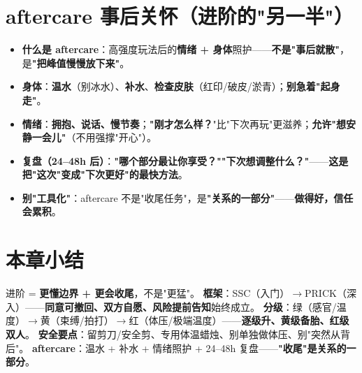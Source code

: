 \documentclass[12pt,UTF8,openany]{ctexbook}
\begin{document}
\section{aftercare 事后关怀（进阶的"另一半"）}
\begin{itemize}[leftmargin=2em,itemsep=0.3em]
  \item \textbf{什么是 aftercare}：高强度玩法后的\textbf{情绪 + 身体}照护——\textbf{不是"事后就散"}，是\textbf{"把峰值慢慢放下来"}。
  \item \textbf{身体}：\textbf{温水}（别冰水）、\textbf{补水}、\textbf{检查皮肤}（红印/破皮/淤青）；\textbf{别急着"起身走"}。
  \item \textbf{情绪}：\textbf{拥抱、说话、慢节奏}；\textbf{"刚才怎么样？}"比"下次再玩"更滋养；\textbf{允许"想安静一会儿"}（不用强撑"开心"）。
  \item \textbf{复盘（24--48h 后）}：\textbf{"哪个部分最让你享受？""下次想调整什么？"}——\textbf{这是把"这次"变成"下次更好"的最快方法}。
  \item \textbf{别"工具化"}：aftercare 不是"收尾任务"，是\textbf{"关系的一部分"}——\textbf{做得好，信任会累积}。
\end{itemize}

\section{本章小结}
进阶 = \textbf{更懂边界 + 更会收尾}，不是"更猛"。
\textbf{框架}：SSC（入门）$\to$PRICK（深入）——\textbf{同意可撤回、双方自愿、风险提前告知}始终成立。
\textbf{分级}：绿（感官/温度）$\to$黄（束缚/拍打）$\to$红（体压/极端温度）——\textbf{逐级升、黄级备胎、红级双人}。
\textbf{安全要点}：留剪刀/安全剪、专用体温蜡烛、别单独做体压、别"突然从背后"。
\textbf{aftercare}：温水 + 补水 + 情绪照护 + 24--48h 复盘——\textbf{"收尾"是关系的一部分}。
\end{document}

